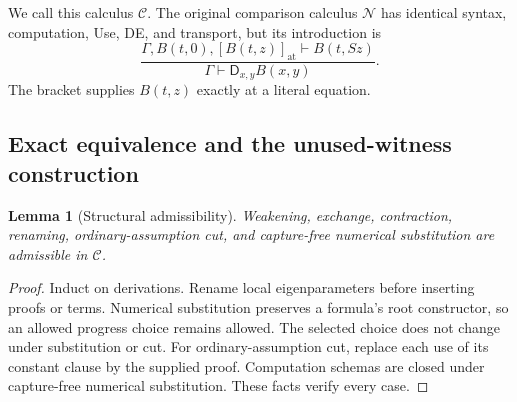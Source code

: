 \documentclass[11pt,letterpaper]{article}
\newtheorem{lemma}[theorem]{Lemma}
\theoremstyle{definition}\newtheorem{definition}[theorem]{Definition}
\theoremstyle{remark}\newtheorem{remark}[theorem]{Remark}
\begin{document}
We call this calculus $\mathcal C$. The original comparison
calculus $\mathcal N$ has identical syntax, computation,
Use, DE, and transport, but its introduction is
\[
\frac{\Gamma,B(t,0),[B(t,z)]_{\mathrm{at}}\vdash B(t,Sz)}
     {\Gamma\vdash\mathsf D_{x,y}B(x,y)}.
\tag{Old DI}\label{eq:choice-old-di}
\]
The bracket supplies $B(t,z)$ exactly at a literal equation.

\subsection{Exact equivalence and the unused-witness construction}

\begin{lemma}[Structural admissibility]
\label{lem:choice-structural}
Weakening, exchange, contraction, renaming, ordinary-assumption cut,
and capture-free numerical substitution are admissible in $\mathcal C$.
\end{lemma}
\begin{proof}
Induct on derivations. Rename local eigenparameters before inserting
proofs or terms. Numerical substitution preserves a formula's root
constructor, so an allowed progress choice remains allowed.
The selected choice does not change under substitution or cut.
For ordinary-assumption cut, replace each use of its constant clause
by the supplied proof. Computation schemas are closed under
capture-free numerical substitution. These facts verify every case.
\end{proof}
\end{document}
